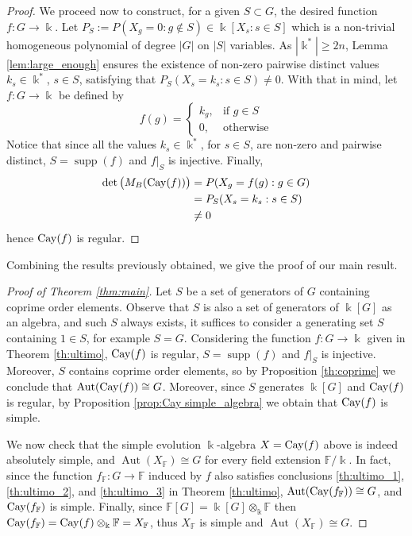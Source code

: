 \documentclass[a4paper,12pt]{amsart}
\theoremstyle{definition}
\theoremstyle{remark}
\newcommand{\Aut}{\operatorname{Aut}}
\newcommand{\Cay}{{\rm Cay}}
\newcommand{\supp}{\operatorname{supp}}
\begin{document}
\begin{proof}
We proceed now to construct, for a given $S \subset G$,  the desired function $f\colon G\to \Bbbk$. Let  $P_S:=P(X_g=0: g\not\in S)\in\Bbbk[X_s:s\in S]$ which is a non-trivial homogeneous polynomial of degree $|G|$ on $|S|$ variables. As $|\Bbbk^*| \geq 2n$, Lemma \ref{lem:large_enough} ensures the existence of non-zero pairwise distinct values $k_s\in\Bbbk^*$, $s\in S$, satisfying that $P_S(X_s=k_s : s\in S)\ne 0$.  With that in mind, let $f\colon G\to \Bbbk$ be defined by
$$
f(g)=\begin{cases}
			k_g, & \text{if $g\in S$}\\
            0, & \text{otherwise}
		 \end{cases}
$$
Notice that since all the values $k_s\in\Bbbk^*$, for $s\in S$, are non-zero and pairwise distinct, $S=\supp(f)$ and $f|_S$ is injective. Finally,
\begin{equation*}
\begin{split}
\det\big(M_B(\Cay(f))\big) & = P(X_g=f(g):g\in G)\\
& = P_S(X_s=k_s:s\in S) \\
& \ne 0
\end{split}
\end{equation*}
hence  $\Cay(f)$ is regular.
\end{proof}


Combining the results previously obtained, we give the proof of our main result.

\begin{proof}[Proof of Theorem \ref{thm:main}]
Let $S$ be a set of generators of $G$ containing coprime order elements. Observe that $S$ is also a set of generators of $\Bbbk[G] $ as an algebra, and such $S$ always exists,  it suffices 
to consider a generating set $S$ containing $1\in S$, for example $S = G$. Considering the function $f:G\rightarrow \Bbbk$ given in Theorem \ref{th:ultimo}, $\Cay(f)$ is regular, $S=\supp(f)$ and $f|_S$ is injective. Moreover, $S$ contains coprime order elements, so by Proposition \ref{th:coprime} we  conclude that $\Aut(\Cay(f))\cong G$.  Moreover, since $S$ generates $\Bbbk[G]$ and $\Cay(f)$ is regular, by Proposition \ref{prop:Cay simple_algebra} we obtain that $\Cay(f)$ is simple. 

We now check that the simple evolution $\Bbbk$-algebra $X =\Cay(f) $ above is indeed absolutely simple, and $\Aut(X_{\mathbb F})\cong G$ for every  field extension $\mathbb{F}/\Bbbk$. In fact, since the function $f_{\mathbb F}\colon G\to {\mathbb F}$ induced by $f$ also satisfies conclusions \eqref{th:ultimo_1},   \eqref{th:ultimo_2}, and  \eqref{th:ultimo_3} in Theorem \ref{th:ultimo},  $\Aut(\Cay(f_{\mathbb F}))\cong G$, and $\Cay(f_{\mathbb F})$ is simple. Finally,  since ${\mathbb F}[G]=\Bbbk[G]\otimes_\Bbbk {\mathbb F}$ then  $\Cay(f_{\mathbb F})=\Cay(f)\otimes_\Bbbk {\mathbb F}=X_{\mathbb F}$, thus  $X_{\mathbb F}$ is simple and $\Aut(X_{\mathbb F})\cong G$.


\end{proof}
\end{document}
